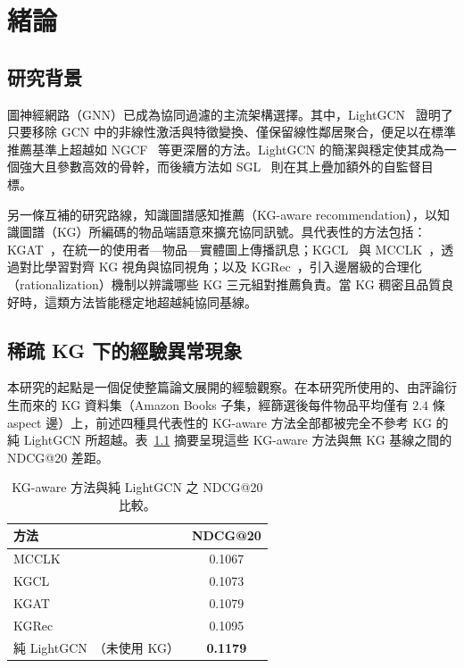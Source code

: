\chapter{緒論}
\label{ch:intro-zh}

\section{研究背景}
\label{sec:intro-background-zh}

圖神經網路（GNN）已成為協同過濾的主流架構選擇。其中，LightGCN~\cite{he2020lightgcn} 證明了只要移除 GCN 中的非線性激活與特徵變換、僅保留線性鄰居聚合，便足以在標準推薦基準上超越如 NGCF~\cite{wang2019ngcf} 等更深層的方法。LightGCN 的簡潔與穩定使其成為一個強大且參數高效的骨幹，而後續方法如 SGL~\cite{wu2021sgl} 則在其上疊加額外的自監督目標。

另一條互補的研究路線，知識圖譜感知推薦（KG-aware recommendation），以知識圖譜（KG）所編碼的物品端語意來擴充協同訊號。具代表性的方法包括：KGAT~\cite{wang2019kgat}，在統一的使用者—物品—實體圖上傳播訊息；KGCL~\cite{yang2022kgcl} 與 MCCLK~\cite{zou2022mcclk}，透過對比學習對齊 KG 視角與協同視角；以及 KGRec~\cite{yang2023kgrec}，引入邊層級的合理化（rationalization）機制以辨識哪些 KG 三元組對推薦負責。當 KG 稠密且品質良好時，這類方法皆能穩定地超越純協同基線。

\section{稀疏 KG 下的經驗異常現象}
\label{sec:intro-observation-zh}

本研究的起點是一個促使整篇論文展開的經驗觀察。在本研究所使用的、由評論衍生而來的 KG 資料集（Amazon Books 子集，經篩選後每件物品平均僅有 $2.4$ 條 aspect 邊）上，前述四種具代表性的 KG-aware 方法全部都被完全不參考 KG 的純 LightGCN 所超越。表~\ref{tab:intro-baseline-zh} 摘要呈現這些 KG-aware 方法與無 KG 基線之間的 NDCG@20 差距。

\begin{table}[H]
\centering
\caption{KG-aware 方法與純 LightGCN 之 NDCG@20 比較。}
\label{tab:intro-baseline-zh}
\begin{tabular}{lc}
\toprule
方法 & NDCG@20 \\
\midrule
MCCLK~\cite{zou2022mcclk}      & 0.1067 \\
KGCL~\cite{yang2022kgcl}       & 0.1073 \\
KGAT~\cite{wang2019kgat}       & 0.1079 \\
KGRec~\cite{yang2023kgrec}     & 0.1095 \\
\midrule
純 LightGCN~\cite{he2020lightgcn}（未使用 KG） & \textbf{0.1179} \\
\bottomrule
\end{tabular}
\end{table}
\FloatBarrier

